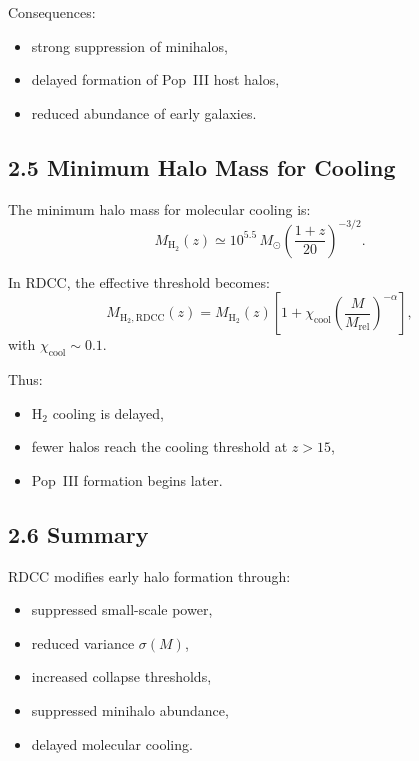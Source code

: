 \documentclass[11pt,a4paper]{article}
\begin{document}
Consequences:

\begin{itemize}
    \item strong suppression of minihalos,
    \item delayed formation of Pop~III host halos,
    \item reduced abundance of early galaxies.
\end{itemize}

\subsection*{2.5 Minimum Halo Mass for Cooling}

The minimum halo mass for molecular cooling is:
\begin{equation}
    M_{\mathrm{H_2}}(z)
    \simeq 10^{5.5}\,M_{\odot}
    \left(\frac{1+z}{20}\right)^{-3/2}.
\end{equation}

In RDCC, the effective threshold becomes:
\begin{equation}
    M_{\mathrm{H_2,RDCC}}(z)
    = M_{\mathrm{H_2}}(z)
      \left[
        1 + \chi_{\mathrm{cool}}
        \left(\frac{M}{M_{\mathrm{rel}}}\right)^{-\alpha}
      \right],
\end{equation}
with $\chi_{\mathrm{cool}} \sim 0.1$.

Thus:

\begin{itemize}
    \item $\mathrm{H}_2$ cooling is delayed,
    \item fewer halos reach the cooling threshold at $z > 15$,
    \item Pop~III formation begins later.
\end{itemize}

\subsection*{2.6 Summary}

RDCC modifies early halo formation through:

\begin{itemize}
    \item suppressed small-scale power,
    \item reduced variance $\sigma(M)$,
    \item increased collapse thresholds,
    \item suppressed minihalo abundance,
    \item delayed molecular cooling.
\end{itemize}
\end{document}
